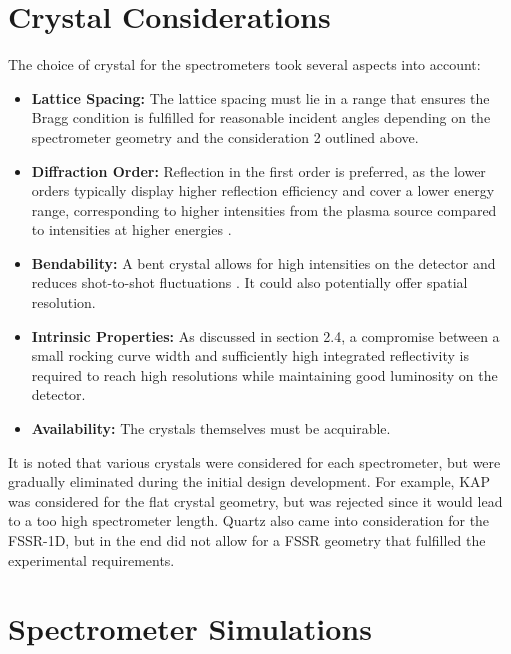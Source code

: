 \appendix
\addappheadtotoc
\renewcommand{\thechapter}{\Roman{chapter}}
\renewcommand{\thesection}{\roman{section}}

\chapter{Crystal Considerations}
\label{section: crystal}

The choice 
of crystal for the spectrometers took several 
aspects into account: 
\begin{itemize}
	\item \textbf{Lattice Spacing:} The lattice 
	spacing must lie in a range that ensures the 
	Bragg condition is fulfilled for reasonable 
	incident angles depending on the spectrometer 
	geometry and the consideration 2 outlined above. 
	\item \textbf{Diffraction Order:} Reflection 
	in the first order is preferred, as the lower 
	orders 
	typically display 
	higher reflection efficiency and cover a lower 
	energy range, corresponding to higher intensities 
	from the plasma source compared 
	to intensities at higher energies 
	\citep{monot2002high, 
	renner2019challenges}. 
	\item \textbf{Bendability:} A bent crystal 
	allows for high intensities on the detector 
	and reduces shot-to-shot fluctuations 
	\citep{levy2010double}. It could also potentially 
	offer spatial resolution. 
	\item \textbf{Intrinsic Properties:} As 
	discussed in section 2.4, a compromise between a 
	small rocking 
	curve width and sufficiently high
	integrated reflectivity is required to reach 
	high resolutions while maintaining good luminosity 
	on the detector.
	\item \textbf{Availability:} The crystals 
	themselves must be acquirable.
\end{itemize}

It is noted that various crystals were 
considered for each spectrometer, but were 
gradually eliminated during the initial 
design development. For example, KAP was 
considered for the flat 
crystal geometry, but was rejected since it 
would lead to a too 
high 
spectrometer length. Quartz also 
came into 
consideration for the FSSR-1D, but in 
the end did not allow 
for a FSSR geometry that fulfilled the 
experimental 
requirements. 

\chapter{Spectrometer Simulations}
\label{section: all simulations}

